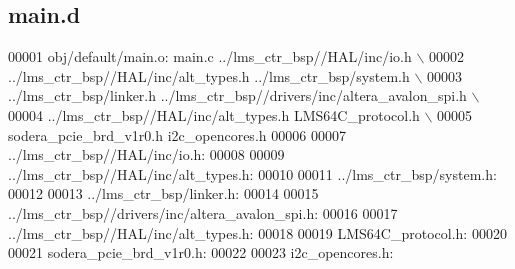 \subsection{main.\+d}
\label{main_8d_source}

\begin{DoxyCode}
00001 obj/\textcolor{keywordflow}{default}/main.o: main.c ../lms\_ctr\_bsp\textcolor{comment}{//HAL/inc/io.h \(\backslash\)}
00002 \textcolor{comment}{ ../lms\_ctr\_bsp//HAL/inc/alt\_types.h ../lms\_ctr\_bsp/system.h \(\backslash\)}
00003 \textcolor{comment}{ ../lms\_ctr\_bsp/linker.h ../lms\_ctr\_bsp//drivers/inc/altera\_avalon\_spi.h \(\backslash\)}
00004 \textcolor{comment}{ ../lms\_ctr\_bsp//HAL/inc/alt\_types.h LMS64C\_protocol.h \(\backslash\)}
00005 \textcolor{comment}{ sodera\_pcie\_brd\_v1r0.h i2c\_opencores.h}
00006 
00007 ../lms\_ctr\_bsp\textcolor{comment}{//HAL/inc/io.h:}
00008 
00009 ../lms\_ctr\_bsp\textcolor{comment}{//HAL/inc/alt\_types.h:}
00010 
00011 ../lms\_ctr\_bsp/system.h:
00012 
00013 ../lms\_ctr\_bsp/linker.h:
00014 
00015 ../lms\_ctr\_bsp\textcolor{comment}{//drivers/inc/altera\_avalon\_spi.h:}
00016 
00017 ../lms\_ctr\_bsp\textcolor{comment}{//HAL/inc/alt\_types.h:}
00018 
00019 LMS64C\_protocol.h:
00020 
00021 sodera\_pcie\_brd\_v1r0.h:
00022 
00023 i2c\_opencores.h:
\end{DoxyCode}
